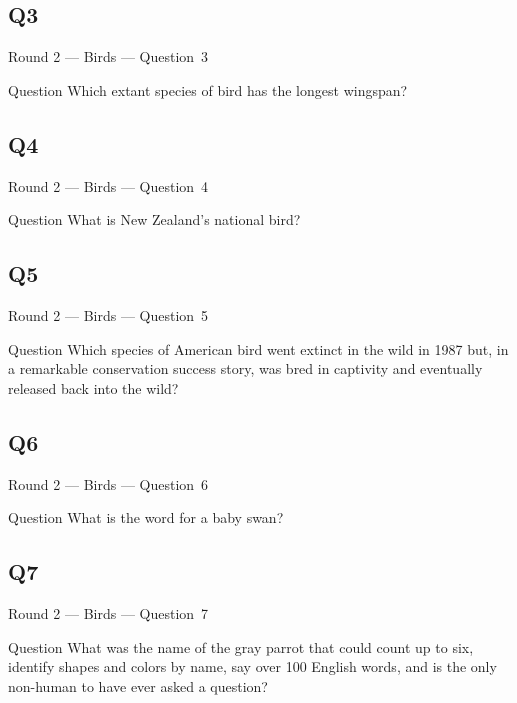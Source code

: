 \documentclass[11pt]{beamer}
\begin{document}
\subsection*{Q3}
\begin{frame}[t]{Round 2 --- Birds --- \mbox{Question 3}}
\vspace{-0.5em}
\begin{block}{Question}
Which extant species of bird has the longest wingspan?
\end{block}
\end{frame}
\subsection*{Q4}
\begin{frame}[t]{Round 2 --- Birds --- \mbox{Question 4}}
\vspace{-0.5em}
\begin{block}{Question}
What is New Zealand's national bird?
\end{block}
\end{frame}
\subsection*{Q5}
\begin{frame}[t]{Round 2 --- Birds --- \mbox{Question 5}}
\vspace{-0.5em}
\begin{block}{Question}
Which species of American bird went extinct in the wild in 1987 but, in a remarkable conservation success story, was bred in captivity and eventually released back into the wild?
\end{block}
\end{frame}
\subsection*{Q6}
\begin{frame}[t]{Round 2 --- Birds --- \mbox{Question 6}}
\vspace{-0.5em}
\begin{block}{Question}
What is the word for a baby swan?
\end{block}
\end{frame}
\subsection*{Q7}
\begin{frame}[t]{Round 2 --- Birds --- \mbox{Question 7}}
\vspace{-0.5em}
\begin{block}{Question}
What was the name of the gray parrot that could count up to six, identify shapes and colors by name, say over 100 English words, and is the only non-human to have ever asked a question?
\end{block}
\end{frame}
\end{document}
